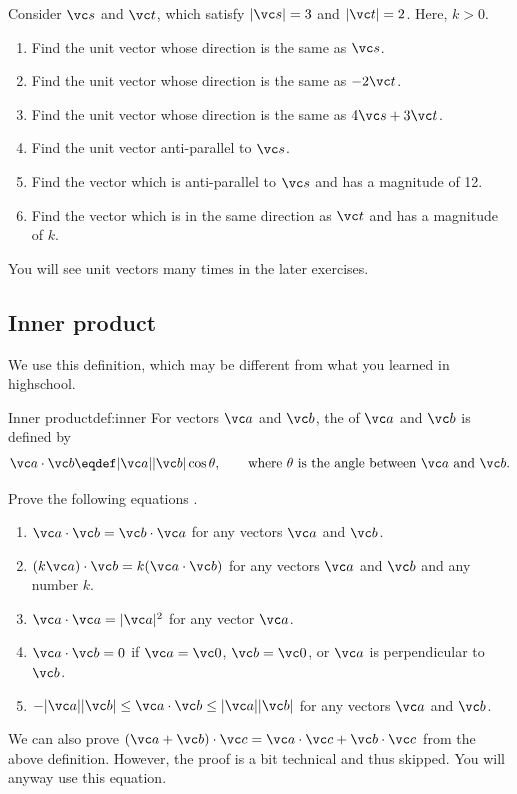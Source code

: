 \documentclass[11pt,pdfa,lastpage]{MishoNote}
\begin{document}
\begin{problems}
 \Problem[A] Consider $\vc s$ and $\vc t$, which satisfy $|\vc s|=3$ and $|\vc t|=2$. Here, $k>0$.
 \begin{enumerate}
   \item Find the unit vector whose direction is the same as $\vc s$.
   \item Find the unit vector whose direction is the same as $-2\vc t$.
   \item Find the unit vector whose direction is the same as $4\vc s+3\vc t$.
   \item Find the unit vector anti-parallel to $\vc s$.
   \item Find the vector which is anti-parallel to $\vc s$ and has a magnitude of 12.
   \item Find the vector which is in the same direction as $\vc t$ and has a magnitude of $k$.
 \end{enumerate}
\end{problems}

You will see unit vectors many times in the later exercises.

\newpage
\subsection{Inner product}
We use this definition, which may be different from what you learned in highschool.
\begin{definition}{Inner product}{def:inner}
  For vectors $\vc a$ and $\vc b$, the  of $\vc a$ and $\vc b$ is defined by
  \[ \vc a\cdot\vc b\deq|\vc a||\vc b|\cos\theta, \qquad \text{where $\theta$ is the angle between $\vc a$ and $\vc b$.} \]
\end{definition}
\begin{problems}
  \Problem[A] Prove the following equations .
  \begin{enumerate}
    \item $\vc a\cdot\vc b=\vc b\cdot\vc a$ for any vectors $\vc a$ and $\vc b$.
    \item $(k\vc a)\cdot\vc b=k(\vc a\cdot\vc b)$ for any vectors $\vc a$ and $\vc b$ and any number $k$.
    \item $\vc a\cdot\vc a=|\vc a|^2$ for any vector $\vc a$.
    \item $\vc a\cdot\vc b=0$ if $\vc a=\vc 0$, $\vc b=\vc 0$, or $\vc a$ is perpendicular to $\vc b$.
    \item $-|\vc a||\vc b|\le \vc a\cdot\vc b\le|\vc a||\vc b|$ for any vectors $\vc a$ and $\vc b$.
  \end{enumerate}
\end{problems}
We can also prove $(\vc a+\vc b)\cdot\vc c=\vc a\cdot\vc c+\vc b\cdot \vc c$ from the above definition. However, the proof is a bit technical and thus skipped. You will anyway use this equation.
\end{document}
